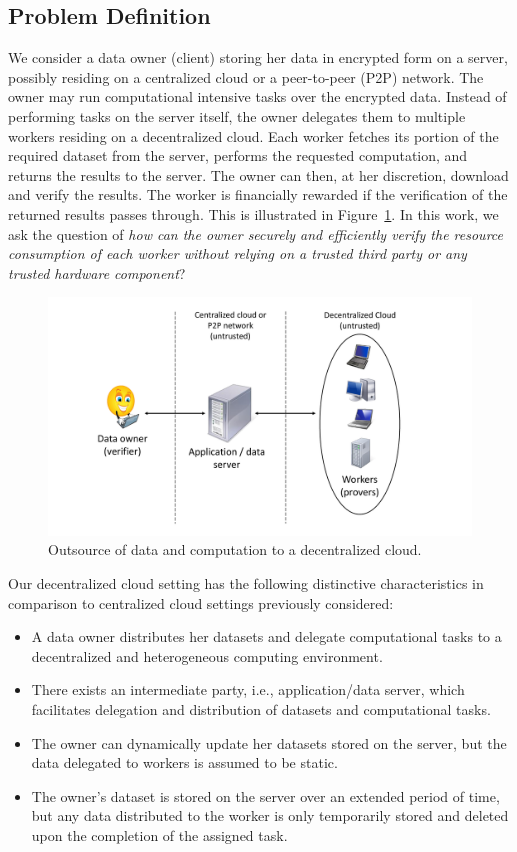 \subsection{Problem Definition} \label{sect:problem}

We consider a data owner (client) storing her data in encrypted form on a server, possibly residing on a centralized cloud or a peer-to-peer (P2P) network.
The owner may run computational intensive tasks over the encrypted data.
Instead of performing tasks on the server itself, the owner delegates them to multiple workers residing on a decentralized cloud. 
Each worker fetches its portion of the required dataset from the server, performs the requested computation, and returns the results to the server.
The owner can then, at her discretion, download and verify the results.
The worker is financially rewarded if the verification of the returned results passes through.
This is illustrated in Figure~\ref{fig:model}.
In this work, we ask the question of {\em how can the owner securely and efficiently verify the resource consumption of each worker without relying on a trusted third party or any trusted hardware component}?

\begin{figure}[h!]\centering
  \includegraphics[scale=0.30]{model.pdf}
  \caption{Outsource of data and computation to a decentralized cloud.}
  \label{fig:model}
\end{figure}

Our decentralized cloud setting has the following distinctive characteristics in comparison to centralized cloud settings previously considered:
\begin{itemize}
 \item A data owner distributes her datasets and delegate computational tasks to a decentralized and heterogeneous computing environment.
 \item There exists an intermediate party, i.e., application/data server, which facilitates delegation and distribution of datasets and computational tasks.
 \item The owner can dynamically update her datasets stored on the server, but the data delegated to workers is assumed to be static.
 \item The owner's dataset is stored on the server over an extended period of time, but any data distributed to the worker is only temporarily stored and deleted upon the completion of the assigned task.
\end{itemize}

